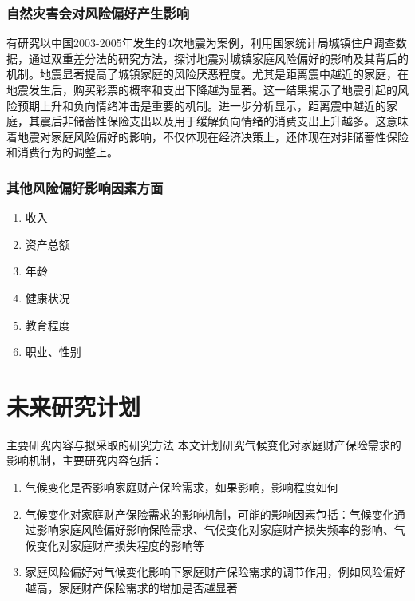 \documentclass[a4paper,12pt]{ctexbeamer}
\begin{document}
\begin{frame}
    \frametitle{自然灾害会对风险偏好产生影响}
    有研究以中国2003-2005年发生的4次地震为案例，利用国家统计局城镇住户调查数据，通过双重差分法的研究方法，探讨地震对城镇家庭风险偏好的影响及其背后的机制\citep{章元0地震冲击对风险偏好的影响}。地震显著提高了城镇家庭的风险厌恶程度。尤其是距离震中越近的家庭，在地震发生后，购买彩票的概率和支出下降越为显著。这一结果揭示了地震引起的风险预期上升和负向情绪冲击是重要的机制。进一步分析显示，距离震中越近的家庭，其震后非储蓄性保险支出以及用于缓解负向情绪的消费支出上升越多。这意味着地震对家庭风险偏好的影响，不仅体现在经济决策上，还体现在对非储蓄性保险和消费行为的调整上。
\end{frame}
\begin{frame}
    \frametitle{其他风险偏好影响因素方面}
    \begin{enumerate}
        \item 收入\citep{石双2018收入与风险偏好}
        \item 资产总额\citep{卢亚娟殷君瑶2021户主风险态度对家庭金融资产配置的影响研究}
        \item 年龄\citep{王晶2021年龄结构}
        \item 健康状况\citep{雷晓燕2010中国家庭的资产组合选择}
        \item 教育程度\citep{梁立俊2018受教育程度与主客观风险偏好}
        \item 职业\citep{赵颖2017中国劳动者的风险偏好与职业选择}、性别\citep{徐小华2019女性劳动参与会影响家庭资产配置风险偏好吗}
    \end{enumerate}
\end{frame}

\section{未来研究计划}


\begin{frame}{主要研究内容与拟采取的研究方法}
    本文计划研究气候变化对家庭财产保险需求的影响机制，主要研究内容包括：

    \begin{enumerate}
        \item 气候变化是否影响家庭财产保险需求，如果影响，影响程度如何
        \item 气候变化对家庭财产保险需求的影响机制，可能的影响因素包括：气候变化通过影响家庭风险偏好影响保险需求、气候变化对家庭财产损失频率的影响、气候变化对家庭财产损失程度的影响等
        \item 家庭风险偏好对气候变化影响下家庭财产保险需求的调节作用，例如风险偏好越高，家庭财产保险需求的增加是否越显著
    \end{enumerate}
\end{frame}
\end{document}
